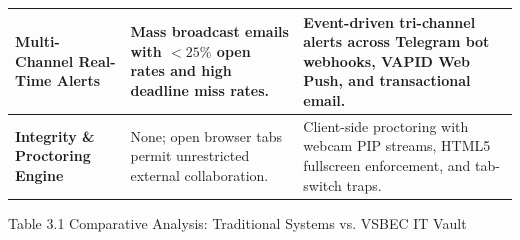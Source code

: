 \begin{table}[H]
\begin{tabularx}{\textwidth}{|p{3.2cm}|p{5.8cm}|L|}
    \hline
    \textbf{Multi-Channel Real-Time Alerts} & Mass broadcast emails with $< 25\%$ open rates and high deadline miss rates. & Event-driven tri-channel alerts across Telegram bot webhooks, VAPID Web Push, and transactional email. \\
    \hline
    \textbf{Integrity \& Proctoring Engine} & None; open browser tabs permit unrestricted external collaboration. & Client-side proctoring with webcam PIP streams, HTML5 fullscreen enforcement, and tab-switch traps. \\
    \hline
  \end{tabularx}
  \vspace{4pt}
  {\centering\fontsize{10.5pt}{14pt}\selectfont Table 3.1 Comparative Analysis: Traditional Systems vs. VSBEC IT Vault\par}
\end{table}
\newpage

